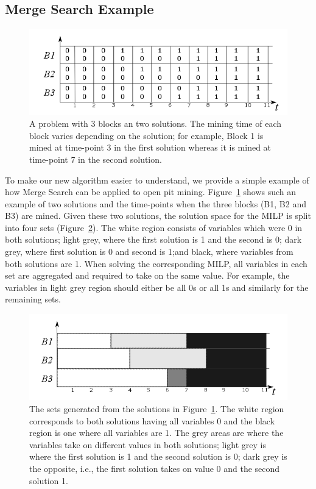 \documentclass[authoryear,11pt,square,number,times,super,comma]{elsarticle}
\begin{document}
\subsection{Merge Search Example}
\begin{figure}[hb!]
  \includegraphics[width=14cm]{OPBS-MS-orig.png}
  \centering
  \caption{A problem with 3 blocks an two solutions. The mining time of each block varies depending on the solution; for example, Block 1 is mined at time-point 3 in the first solution whereas it is mined at time-point 7 in the second solution.}
  \label{fig:MSorig}
\end{figure}

To make our new algorithm easier to understand, we provide a simple example of how Merge Search can be applied to open pit mining. Figure~\ref{fig:MSorig} shows such an example of two solutions and the time-points when the three blocks (B1, B2 and B3) are mined. Given these two solutions, the solution space for the MILP is split into four sets (Figure~\ref{fig:MS1}). The white region consists of variables which were 0 in both solutions; light grey, where the first solution is 1 and the second is 0; dark grey, where first solution is 0 and second is 1;and black, where variables from both solutions are 1. When solving the corresponding MILP, all variables in each set are aggregated and required to take on the same value. For example, the variables in light grey region should either be all 0s or all 1s and similarly for the remaining sets. 

\begin{figure}[h!]
  \includegraphics[width=14cm]{OPBS-MS.png}
  \centering
  \caption{The sets generated from the solutions in Figure~\ref{fig:MSorig}. The white region corresponds to both solutions having all variables 0 and the black region is one where all variables are 1. The grey areas are where the variables take on different values in both solutions; light grey is where the first solution is 1 and the second solution is 0; dark grey is the opposite, i.e., the first solution takes on value 0 and the second solution 1. }
  \label{fig:MS1}
\end{figure}
\end{document}
